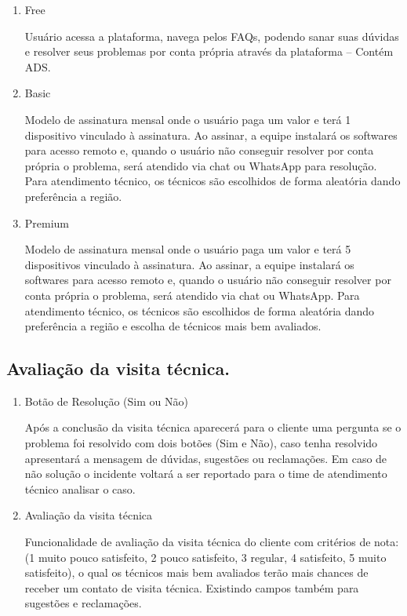 \documentclass[
    12pt,               %
    openright,          %
    oneside,
    a4paper,            %
    MODELO,             %
    english,            %
    brazil              %
   ]{ifsp-spo-inf-ctds}
\begin{document}
	\begin{enumerate}
		
		\item Free
		
		Usuário acessa a plataforma, navega pelos FAQs, podendo sanar suas dúvidas e resolver seus problemas por conta própria através da plataforma – Contém ADS.
		
		\item Basic
		
		Modelo de assinatura mensal onde o usuário paga um valor e terá 1 dispositivo vinculado à assinatura. Ao assinar, a equipe instalará os softwares para acesso remoto e, quando o usuário não conseguir resolver por conta própria o problema, será atendido via chat ou WhatsApp para resolução. Para atendimento técnico, os técnicos são escolhidos de forma aleatória dando preferência a região.
		
		\item Premium
		
		Modelo de assinatura mensal onde o usuário paga um valor e terá 5 dispositivos vinculado à assinatura. Ao assinar, a equipe instalará os softwares para acesso remoto e, quando o usuário não conseguir resolver por conta própria o problema, será atendido via chat ou WhatsApp. Para atendimento técnico, os técnicos são escolhidos de forma aleatória dando preferência a região e escolha de técnicos mais bem avaliados.
		
	\end{enumerate}

\subsection{Avaliação da visita técnica.}

	\begin{enumerate}
		
		\item Botão de Resolução (Sim ou Não)
		
		Após a conclusão da visita técnica aparecerá para o cliente uma pergunta se o problema foi resolvido com dois botões (Sim e Não), caso tenha resolvido apresentará a mensagem de dúvidas, sugestões ou reclamações. Em caso de não solução o incidente voltará a ser reportado para o time de atendimento técnico analisar o caso. 
		
		\item Avaliação da visita técnica
		
		Funcionalidade de avaliação da visita técnica do cliente com critérios de nota:(1 muito pouco satisfeito, 2 pouco satisfeito, 3 regular, 4 satisfeito, 5 muito satisfeito), o qual os técnicos mais bem avaliados terão mais chances de receber um contato de visita técnica. Existindo campos também para sugestões e reclamações.
		
	\end{enumerate}
\end{document}
